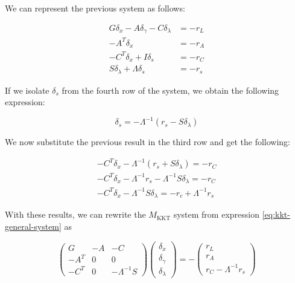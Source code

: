 \documentclass[11pt,a4paper]{article}
\begin{document}
We can represent the previous system as follows:

\begin{equation*}
  \begin{aligned}
    G\delta_x - A\delta_\gamma - C\delta_\lambda &= -r_L \\
    -A^T\delta_x &= -r_A \\
    -C^T\delta_x + I\delta_s &= -r_C \\
    S\delta_\lambda + \Lambda\delta_s &= -r_s
  \end{aligned}
\end{equation*}

If we isolate $\delta_s$ from the fourth row of the system, we obtain the following
expression:

\[
  \delta_s = -\Lambda^{-1}(r_s - S\delta_\lambda)
\]

We now substitute the previous result in the third row and get the following:

\begin{equation*}
  \begin{gathered}
    -C^T\delta_x - \Lambda^{-1}(r_s + S\delta_\lambda) = -r_C \\
    -C^T\delta_x - \Lambda^{-1}r_s - \Lambda^{-1}S\delta_\lambda = -r_C \\
    -C^T\delta_x - \Lambda^{-1}S\delta_\lambda = -r_c + \Lambda^{-1}r_s
  \end{gathered}
\end{equation*}

With these results, we can rewrite the $M_\text{KKT}$ system from expression
\eqref{eq:kkt-general-system} as

\begin{equation}
  \begin{pmatrix}
    G & -A & -C \\
    -A^T & 0 & 0 \\
    -C^T & 0 & -\Lambda^{-1}S
  \end{pmatrix}
  \begin{pmatrix}
    \delta_x \\
    \delta_\gamma \\
    \delta_\lambda
  \end{pmatrix}
  =
  -
  \begin{pmatrix}
    r_L \\
    r_A \\
    r_C - \Lambda^{-1}r_s
  \end{pmatrix}
\end{equation}
\end{document}
